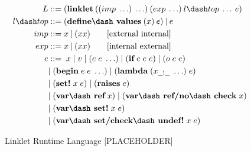 \begin{figure}[!htbp]
    \centering
    \begin{align*}
        L  &::= (\textbf{linklet}\:((imp\: \ldots)\: \ldots)\:(exp\: \ldots)\:l\dash top\:\ldots\:e)\\
        l\dash top &::= (\textbf{define\dash values}\:(x)\:e)\:|\:e \\
        imp &::= x\:|\:(x x) \tag*{[external internal]}\\
        exp &::= x\:|\:(x x) \tag*{[internal external]} \\
        e &::=\; x\; |\; v\; |\; (e\; e\; \ldots)\; |\; (\textbf{if}\; e\; e\; e)\; |\; (o\; e\; e)\; \\
        \; &|\; (\textbf{begin}\; e\; e\; \ldots)\; |\; (\textbf{lambda}\; (x_{\_!\_}\; \ldots)\; e)\\
        \; &|\; (\textbf{set!}\; x\; e)\; |\; (\textbf{raises}\; e)\\
        \; &|\; (\textbf{var\dash ref}\; x)\; |\; (\textbf{var\dash ref/no\dash check}\; x) \\
        \; &|\; (\textbf{var\dash set!}\; x\; e)  \\
        \; &|\; (\textbf{var\dash set/check\dash undef!}\; x\; e)
	\end{align*}
    \caption{Linklet Runtime Language [PLACEHOLDER]}
    \label{fig:linklet-runtime-language}
\end{figure}